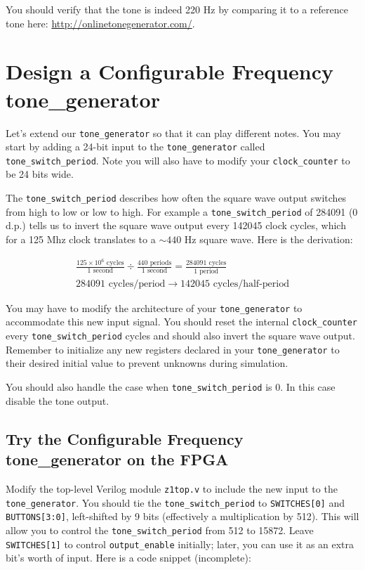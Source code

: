 \documentclass[11pt]{article}
\begin{document}
You should verify that the tone is indeed 220 Hz by comparing it to a reference tone here: \url{http://onlinetonegenerator.com/}.

\section{Design a Configurable Frequency tone\_generator}

Let's extend our \verb|tone_generator| so that it can play different notes. You may start by adding a 24-bit input to the \verb|tone_generator| called \verb|tone_switch_period|. Note you will also have to modify your \verb|clock_counter| to be 24 bits wide.

The \verb|tone_switch_period| describes how often the square wave output switches from high to low or low to high. For example a \verb|tone_switch_period| of 284091 (0 d.p.) tells us to invert the square wave output every 142045 clock cycles, which for a 125 Mhz clock translates to a $\sim 440$ Hz square wave. Here is the derivation:

\begin{eqnarray}
  \frac{125 \times 10^6 \text{ cycles}}{1 \text{ second}} \div \frac{440 \text{ periods}}{1 \text{ second}} = \frac{ 284091 \text{ cycles}}{1 \text{ period}} \nonumber \\
  284091 \text{ cycles/period} \rightarrow 142045 \text{ cycles/half-period} \nonumber
\end{eqnarray}

You may have to modify the architecture of your \verb|tone_generator| to accommodate this new input signal. You should reset the internal \verb|clock_counter| every \verb|tone_switch_period| cycles and should also invert the square wave output. Remember to initialize any new registers declared in your \verb|tone_generator| to their desired initial value to prevent unknowns during simulation.

You should also handle the case when \verb|tone_switch_period| is 0.  In this case disable the tone output.

\subsection{Try the Configurable Frequency tone\_generator on the FPGA}
Modify the top-level Verilog module \verb|z1top.v| to include the new input to the \verb|tone_generator|. You should tie the \verb|tone_switch_period| to \verb|SWITCHES[0]| and \verb|BUTTONS[3:0]|, left-shifted by 9 bits (effectively a multiplication by 512). This will allow you to control the \verb|tone_switch_period| from 512 to 15872. Leave \verb|SWITCHES[1]| to control \verb|output_enable| initially; later, you can use it as an extra bit's worth of input. Here is a code snippet (incomplete):
\end{document}
